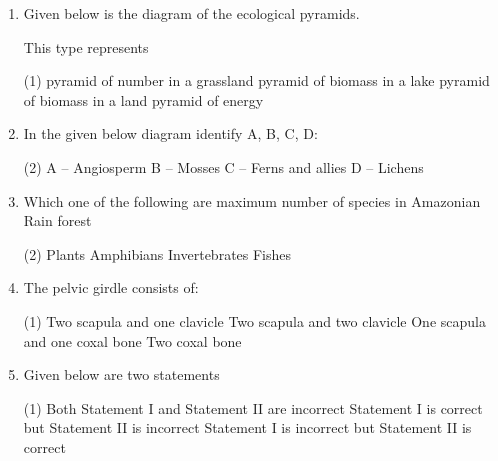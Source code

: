 \documentclass[twocolumn]{article}
\begin{document}
\begin{enumerate}
    

    \item Given below is the diagram of the ecological pyramids.
          \begin{center}
          \end{center}
          This type represents
          \begin{tasks}(1)
              \task pyramid of number in a grassland
              \task pyramid of biomass in a lake
              \task pyramid of biomass in a land
              \task pyramid of energy
          \end{tasks}
    \item In the given below diagram identify A, B, C, D:
          \begin{center}
          \end{center}
          \begin{tasks}(2)
              \task A -- Angiosperm
              \task B -- Mosses
              \task C -- Ferns and allies
              \task D -- Lichens
          \end{tasks}
    \item Which one of the following are maximum number of species in Amazonian Rain forest
          \begin{tasks}(2)
              \task Plants
              \task Amphibians
              \task Invertebrates
              \task Fishes
          \end{tasks}
    \item The pelvic girdle consists of:
          \begin{tasks}(1)
              \task Two scapula and one clavicle
              \task Two scapula and two clavicle
              \task One scapula and one coxal bone
              \task Two coxal bone
          \end{tasks}
    \item Given below are two statements
          \begin{tasks}(1)
              \task Both Statement I and Statement II are incorrect
              \task Statement I is correct but Statement II is incorrect
              \task Statement I is incorrect but Statement II is correct

\end{tasks}
\end{enumerate}
\end{document}
